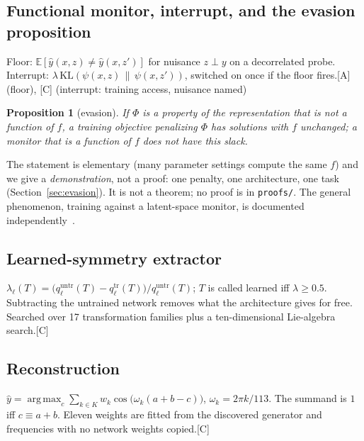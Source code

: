 \documentclass[11pt]{article}
\newtheorem{proposition}{Proposition}
\newcommand{\E}{\mathbb{E}}
\newcommand{\argmax}{\operatorname*{arg\,max}}
\newcommand{\lev}[1]{\textsc{[#1]}}%
\begin{document}
\subsection{Functional monitor, interrupt, and the evasion proposition}
Floor: $\E[\hat y(x,z)\ne\hat y(x,z')]$ for nuisance $z\perp y$ on a decorrelated probe. Interrupt: $\lambda\,\mathrm{KL}(\psi(x,z)\,\|\,\psi(x,z'))$, switched on once if the floor fires.\hfill\lev{A} (floor), \lev{C} (interrupt: training access, nuisance named)
\begin{proposition}[evasion]\label{prop:evasion}
If $\Phi$ is a property of the representation that is not a function of $f$, a training objective penalizing $\Phi$ has solutions with $f$ unchanged; a monitor that is a function of $f$ does not have this slack.
\end{proposition}
The statement is elementary (many parameter settings compute the same $f$) and we give a \emph{demonstration}, not a proof: one penalty, one architecture, one task (Section~\ref{sec:evasion}). It is not a theorem; no proof is in \texttt{proofs/}. The general phenomenon, training against a latent-space monitor, is documented independently~\cite{bailey}.

\subsection{Learned-symmetry extractor}
$\lambda_\ell(T)=\big(q^{\text{untr}}_\ell(T)-q^{\text{tr}}_\ell(T)\big)/q^{\text{untr}}_\ell(T)$; $T$ is called learned iff $\lambda\ge0.5$. Subtracting the untrained network removes what the architecture gives for free. Searched over 17 transformation families plus a ten-dimensional Lie-algebra search.\hfill\lev{C}

\subsection{Reconstruction}
$\hat y=\argmax_c\sum_{k\in K}w_k\cos\!\big(\omega_k(a+b-c)\big)$, $\omega_k=2\pi k/113$. The summand is $1$ iff $c\equiv a+b$. Eleven weights are fitted from the discovered generator and frequencies with no network weights copied.\hfill\lev{C}
\end{document}
